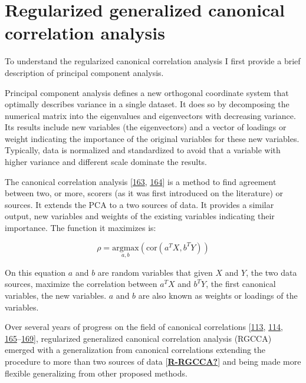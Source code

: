 \documentclass[
  a4paper,
]{book}
\begin{document}
\hypertarget{regularized-generalized-canonical-correlation-analysis}{%
\section{Regularized generalized canonical correlation analysis}\label{regularized-generalized-canonical-correlation-analysis}}

To understand the regularized canonical correlation analysis I first provide a brief description of principal component analysis.

Principal component analysis defines a new orthogonal coordinate system that optimally describes variance in a single dataset.
It does so by decomposing the numerical matrix into the eigenvalues and eigenvectors with decreasing variance.
Its results include new variables (the eigenvectors) and a vector of loadings or weight indicating the importance of the original variables for these new variables.
Typically, data is normalized and standardized to avoid that a variable with higher variance and different scale dominate the results.

The canonical correlation analysis {[}\protect\hyperlink{ref-jordan1875}{163}, \protect\hyperlink{ref-hotelling1936}{164}{]} is a method to find agreement between two, or more, scorers (as it was first introduced on the literature) or sources.
It extends the PCA to a two sources of data.
It provides a similar output, new variables and weights of the existing variables indicating their importance.
The function it maximizes is:

\[
\rho = \underset{a, b}{\text{argmax}} (\text{cor}(a^T X, b^T Y))
\]

On this equation \(a\) and \(b\) are random variables that given \(X\) and \(Y\), the two data sources, maximize the correlation between \(a^T X\) and \(b^T Y\), the first canonical variables, the new variables.
\(a\) and \(b\) are also known as weights or loadings of the variables.

Over several years of progress on the field of canonical correlations {[}\protect\hyperlink{ref-tenenhaus_regularized_2011}{113}, \protect\hyperlink{ref-tenenhaus_variable_2014}{114}, \protect\hyperlink{ref-tenenhaus_component-based_2008}{165}--\protect\hyperlink{ref-gloaguen2020}{169}{]}, regularized generalized canonical correlation analysis (RGCCA) emerged with a generalization from canonical correlations extending the procedure to more than two sources of data {[}\protect\hyperlink{ref-R-RGCCA}{\textbf{R-RGCCA?}}{]} and being made more flexible generalizing from other proposed methods.
\end{document}
